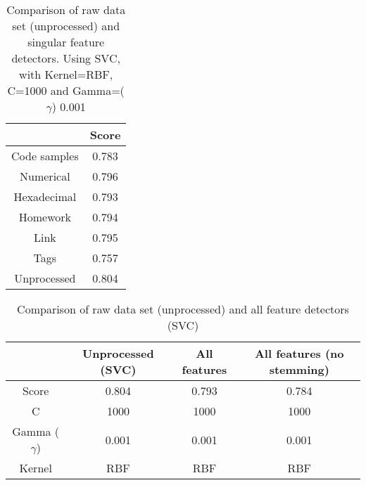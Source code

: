 \begin{table}[!h]%
	\centering
	\begin{tabular}{| c | c |}
		\hline
		~ 				& Score	\\ \hline
		Code samples 	& 0.783	\\ \hline
		Numerical		& 0.796	\\ \hline
		Hexadecimal		& 0.793	\\ \hline
		Homework 		& 0.794	\\ \hline
		Link			& 0.795	\\ \hline
		Tags			& 0.757	\\ \hline
		Unprocessed		& 0.804 \\ \hline
	\end{tabular}
	\caption{Comparison of raw data set (unprocessed) and singular feature detectors. Using SVC, with Kernel=RBF, C=1000 and Gamma=($\gamma$) 0.001}
	\label{tab:singular_feature_detector_so}
\end{table}


\begin{table}[!h]%
	\centering
	\begin{tabular}{| c | c | c | c |}
		\hline
		~ 					& Unprocessed (SVC)	& All features	& All features (no stemming)	\\ \hline
		Score 				& 0.804				& 0.793			& 0.784							\\ \hline
		C					& 1000				& 1000			& 1000							\\ \hline
		Gamma ($\gamma$)	& 0.001				& 0.001			&  0.001							\\ \hline
		Kernel				& RBF				& RBF			& RBF							\\ \hline
	\end{tabular}
	\caption{Comparison of raw data set (unprocessed) and all feature detectors (SVC)}
	\label{tab:unprocessed_vs_all_feature_detectors_svc_so}
\end{table}

